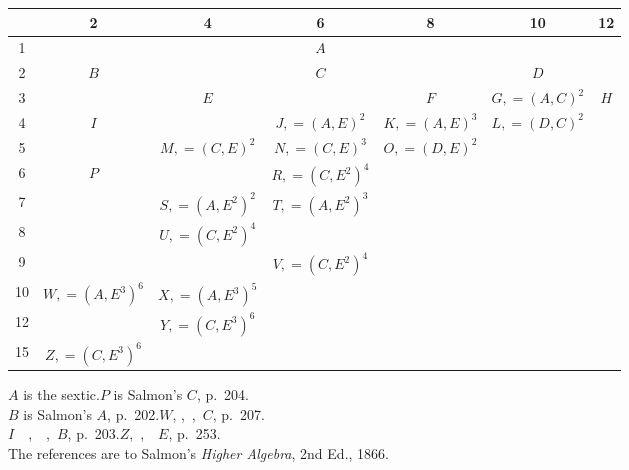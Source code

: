 \documentclass[11pt,a4paper]{article}
\begin{document}
\medskip
\begin{center}
\begin{tabular}{c|cccccc}
   & 2 & 4 & 6 & 8 & 10 & 12 \\
\hline
1  &   &   & $A$            &            &              &     \\
2  & $B$ &   & $C$            &           & $D$          &     \\
3  &   & $E$ &              & $F$       & $G,=(A,C)^{2}$ & $H$ \\
4  & $I$ &   & $J,=(A,E)^{2}$ & $K,=(A,E)^{3}$ & $L,=(D,C)^{2}$ &     \\
5  &   & $M,=(C,E)^{2}$ & $N,=(C,E)^{3}$ & $O,=(D,E)^{2}$ &              &     \\
6  & $P$ &   & $R,=(C,E^{2})^{4}$ &        &              &     \\
7  &   & $S,=(A,E^{2})^{2}$ & $T,=(A,E^{2})^{3}$ &  &              &     \\
8  &   & $U,=(C,E^{2})^{4}$ &       &        &              &     \\
9  &   &   & $V,=(C,E^{2})^{4}$ &   &              &     \\
10 & $W,=(A,E^{3})^{6}$ & $X,=(A,E^{3})^{5}$ &  &        &              &     \\
12 &   & $Y,=(C,E^{3})^{6}$ &           &           &              &     \\
15 & $Z,=(C,E^{3})^{6}$ &  &      &           &              &     \\
\end{tabular}
\end{center}

\medskip
\noindent
$A$ is the sextic.\hfill $P$ is Salmon's $C$, p.\ 204.\\
$B$ is Salmon's $A$, p.\ 202.\hfill $W$, ,\ ,\ $C$, p.\ 207.\\
$I$\ \ ,\ \ ,\ $B$, p.\ 203.\hfill $Z$,\ ,\ \ $E$, p.\ 253.\\
The references are to Salmon's \textit{Higher Algebra}, 2nd Ed., 1866.
\end{document}
